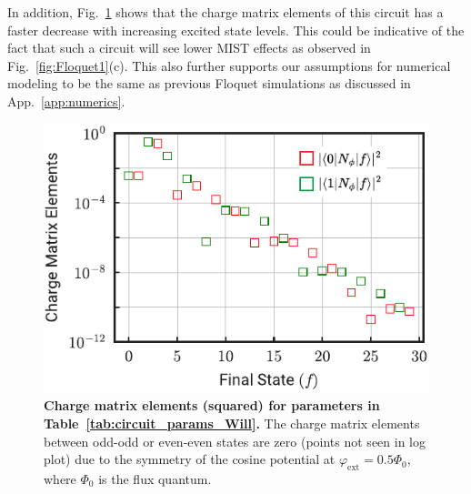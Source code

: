 \documentclass[%
reprint,
superscriptaddress,
 amsmath,amssymb,
 aps,
 prx,
longbibliography,
floatfix,
]{revtex4-2}
\begin{document}
In addition, Fig.~\ref{fig:charge-matrix-Will} shows that the charge matrix elements of this circuit has a faster decrease with increasing excited state levels. This could be indicative of the fact that such a circuit will see lower MIST effects as observed in Fig.~\ref{fig:Floquet1}(c). This also further supports our assumptions for numerical modeling to be the same as previous Floquet simulations as discussed in App.~\ref{app:numerics}.
\begin{figure}[htb]
    \centering
    \includegraphics[width=\linewidth]{Supp_Fig/Charge-matrix-Will.pdf}
    \caption{{\bf Charge matrix elements (squared) for parameters in Table~\ref{tab:circuit_params_Will}.} The charge matrix elements between odd-odd or even-even states are zero (points not seen in log plot) due to the symmetry of the cosine potential at $\varphi_\mathrm{ext}=0.5\Phi_0$, where $\Phi_0$ is the flux quantum.}
    \label{fig:charge-matrix-Will}
\end{figure}
\end{document}
